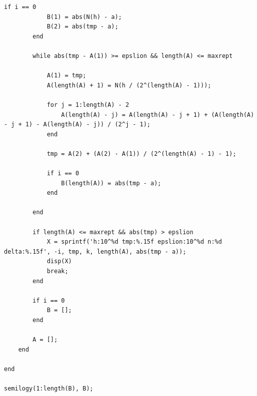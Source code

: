 \documentclass[12pt,a4paper,UTF8]{ctexart}
\theoremstyle{nonumberplain}
\begin{document}
\begin{enumerate}
\begin{enumerate}
\begin{lstlisting}[frame=single]
        if i == 0
            B(1) = abs(N(h) - a);
            B(2) = abs(tmp - a);
        end

        while abs(tmp - A(1)) >= epslion && length(A) <= maxrept

            A(1) = tmp;
            A(length(A) + 1) = N(h / (2^(length(A) - 1)));

            for j = 1:length(A) - 2
                A(length(A) - j) = A(length(A) - j + 1) + (A(length(A) - j + 1) - A(length(A) - j)) / (2^j - 1);
            end

            tmp = A(2) + (A(2) - A(1)) / (2^(length(A) - 1) - 1);

            if i == 0
                B(length(A)) = abs(tmp - a);
            end

        end

        if length(A) <= maxrept && abs(tmp) > epslion
            X = sprintf('h:10^%d tmp:%.15f epslion:10^%d n:%d delta:%.15f', -i, tmp, k, length(A), abs(tmp - a));
            disp(X)
            break;
        end

        if i == 0
            B = [];
        end

        A = [];
    end

end

semilogy(1:length(B), B);


\end{lstlisting}
\end{enumerate}
\end{enumerate}
\end{document}
